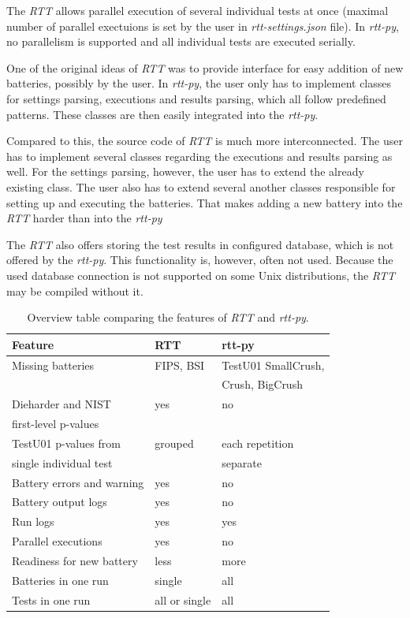 \documentclass[
  digital,     %
  oneside,     %
  nosansbold,  %
  nocolorbold, %
  nolof,         %
  nolot,         %
]{fithesis4}
\begin{document}
The \emph{RTT} allows parallel execution of several individual tests at once (maximal number of parallel exectuions is set by the user in \emph{rtt-settings.json} file). In \emph{rtt-py}, no parallelism is supported and all individual tests are executed serially. 

One of the original ideas of \emph{RTT} was to provide interface for easy addition of new batteries, possibly by the user. In \emph{rtt-py}, the user only has to implement classes for settings parsing, executions and results parsing, which all follow predefined patterns. These classes are then easily integrated into the \emph{rtt-py}.

Compared to this, the source code of \emph{RTT} is much more interconnected. The user has to implement several classes regarding the executions and results parsing as well. For the settings parsing, however, the user has to extend the already existing class. The user also has to extend several another classes responsible for setting up and executing the batteries. That makes adding a new battery into the \emph{RTT} harder than into the \emph{rtt-py}

The \emph{RTT} also offers storing the test results in configured database, which is not offered by the \emph{rtt-py}. This functionality is, however, often not used. Because the used database connection is not supported on some Unix distributions, the \emph{RTT} may be compiled without it.

\begin{table}[t]
  \begin{tabularx}{\textwidth}{l|l|l}
    Feature & RTT & rtt-py \\
    \midrule
    \midrule
    Missing batteries & FIPS, BSI & TestU01 SmallCrush, \\ %
     & & Crush, BigCrush \\
    \midrule
    Dieharder and NIST & yes & no \\ %
     first-level p-values & & \\
    \midrule
    TestU01 p-values from  & grouped & each repetition \\
     single individual test  & &  separate \\
    \midrule
    Battery errors and warning & yes & no \\ %
    \midrule
    Battery output logs & yes & no \\ %
    \midrule
    Run logs & yes & yes \\
    \midrule
    Parallel executions & yes & no \\ %
    \midrule
    Readiness for new battery & less & more \\
    \midrule
    Batteries in one run & single & all \\
    \midrule
    Tests in one run & all or single & all \\
  \end{tabularx}
  \caption{Overview table comparing the features of \emph{RTT} and \emph{rtt-py}.}
  \label{tab:comparison}
\end{table}
\end{document}
